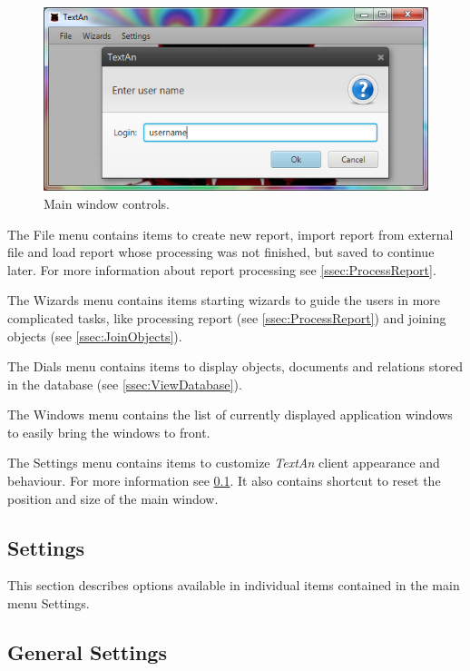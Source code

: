 \documentclass[12pt,a4paper]{report}
\newcommand{\textan}{\emph{TextAn}}
\begin{document}
\begin{figure}[!htb]
        \centering
        \includegraphics[width=\textwidth]{Images/main}
        \caption{Main window controls.}
        \label{fig:MainWindow}
\end{figure}

The File menu contains items to create new report, import report from external
file and load report whose processing was not finished, but saved to continue
later. For more information about report processing see \ref{ssec:ProcessReport}.

The Wizards menu contains items starting wizards to guide the users in more
complicated tasks, like processing report (see \ref{ssec:ProcessReport}) and
joining objects (see \ref{ssec:JoinObjects}).

The Dials menu contains items to display objects, documents and relations
stored in the database (see \ref{ssec:ViewDatabase}).

The Windows menu contains the list of currently displayed application windows
to easily bring the windows to front.

The Settings menu contains items to customize \textan{} client appearance and
behaviour. For more information see \ref{ssec:Settings}. It also contains
shortcut to reset the position and size of the main window.

\subsection{Settings}
\label{ssec:Settings}

This section describes options available in individual items contained in the
main menu Settings.

\subsection{General Settings}
\label{sssec:GeneralSettings}
\end{document}
